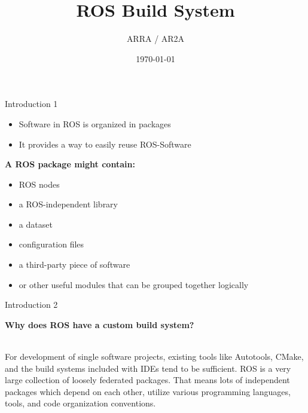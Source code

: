 \documentclass{beamer}
\title[]{ROS Build System} %
\author{ARRA / AR2A} %
\institute %
{
\textbf{A}dvancements for \textbf{R}obotics in \textbf{R}escue \textbf{A}pplications
}
\date{\today} %
\begin{document}
\begin{frame}
\titlepage
\end{frame}
\begin{frame}
\tableofcontents
\end{frame}
\begin{frame}{Introduction 1}
 \begin{itemize}
 \item Software in ROS is organized in packages
 \item It provides a way to easily reuse ROS-Software
 \end{itemize}
 \vspace{1cm}
 \textbf{A ROS package might contain:}
 \begin{itemize}
 \item ROS nodes
 \item  a ROS-independent library
 \item a dataset
 \item configuration files
 \item a third-party piece of software
 \item or other useful modules that can be grouped together logically
 \end{itemize}
\end{frame}
\begin{frame}{Introduction 2}
\begin{large}
\textbf{Why does ROS have a custom build system?}
\end{large}
\vspace{1cm}
\\For development of single software projects, existing tools like Autotools, CMake, and the build systems included with IDEs tend to be sufficient.
\newline
\newline
ROS is a very large collection of loosely federated packages. That means lots of independent packages which depend on each other, utilize various programming languages, tools, and code organization conventions.
\end{frame}
\end{document}
